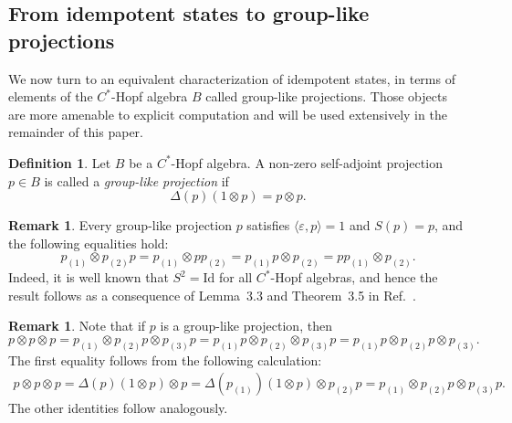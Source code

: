 \documentclass[a4paper,10pt]{amsart}
\newcommand{\eval}[2]{\langle #1 , #2\rangle}
\newcommand{\newterm}[1]{\emph{#1}}
\theoremstyle{definition}
\newtheorem{definition}[theorem]{Definition}
\newtheorem{remark}[theorem]{Remark}
\begin{document}
\subsection{From idempotent states to group-like projections}

We now turn to an equivalent characterization of idempotent states, in terms of elements of the $C^*$-Hopf algebra $B$ called group-like projections. Those objects are more amenable to explicit computation and will be used extensively in the remainder of this paper.

\begin{definition}
\label{def:GrouplikeProjection}
	Let $B$ be a $C^*$-Hopf algebra.
	A non-zero self-adjoint projection $p\in B$ is called a \newterm{group-like projection} if
	\begin{equation}\label{eq:GrouplikeProjection}
		\Delta(p) (1 \otimes p) = p \otimes p.
	\end{equation}
\end{definition}

\begin{remark}\label{rem:basicPropGroupLike}
	Every group-like projection $p$ satisfies $ \eval{\varepsilon}{p} = 1 $ and $S(p) = p$, and the following equalities hold:
	\begin{equation}
    \label{eq:EquivGrouplikeProjDefs}
		p_{(1)} \otimes p_{(2)}p
        =
        p_{(1)} \otimes p p_{(2)}
        =
		p_{(1)}p \otimes p_{(2)}
        =
		p p_{(1)} \otimes p_{(2)}.
	\end{equation}
    Indeed, it is well known that $S^2 = \mathrm{Id}$ for all $C^*$-Hopf algebras, and hence the result follows as a consequence of Lemma~3.3 and Theorem~3.5 in Ref.~\cite{chirvasitu_integrals_2020}.
\end{remark}

\begin{remark}\label{rem:grouplike3}
    Note that if $p$ is a group-like projection, then
    \[
        p \otimes p \otimes p
        =
        p_{(1)} \otimes p_{(2)}p \otimes p_{(3)}p
        =
        p_{(1)}p \otimes p_{(2)} \otimes p_{(3)}p
        =
        p_{(1)}p \otimes p_{(2)}p \otimes p_{(3)}.
    \]
The first equality follows from the following calculation:
    \begin{align*}
        p \otimes p \otimes p
        =
        \Delta(p)(1\otimes p) \otimes p
        =
        \Delta(p_{(1)})(1\otimes p) \otimes p_{(2)} p
        =
        p_{(1)}\otimes p_{(2)} p \otimes p_{(3)} p.
    \end{align*}
    The other identities follow analogously.
\end{remark}
\end{document}
